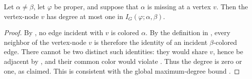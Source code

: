 \begin{lemma}
Let $\alpha\ne\beta$, let $\varphi$ be proper, and suppose that $\alpha$ is
missing at a vertex $v$.  Then the vertex-node $v$ has degree at most one in
$I_G(\varphi;\alpha,\beta)$.
\end{lemma}
\begin{proof}
By , no edge incident with $v$ is colored
$\alpha$.  By the definition in , every
neighbor of the vertex-node $v$ is therefore the identity of an incident
$\beta$-colored edge.  There cannot be two distinct such identities:
they would share $v$, hence be adjacent by , and
their common color would violate .  Thus the
degree is zero or one, as claimed.  This is consistent with the global
maximum-degree bound .
\end{proof}
